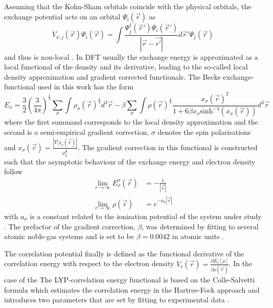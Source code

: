 Assuming that the Kohn-Sham orbitals coincide with the physical orbitals, the exchange potential acts on an orbital $\Psi_i(\vec{r})$ as
\begin{equation} \label{eq:HF_exch}
V_{x;j}(\vec{r})\Psi_i(\vec{r}) =\int \frac{\Psi_j^\dagger(\vec{r}') \Psi_i(\vec{r}')}{\left|\vec{r}-\vec{r'}\right|} d\vec{r}' \Psi_j(\vec{r})
\end{equation}
and thus is non-local \cite{Holthausen}. %
In DFT usually the exchange energy is approximated as a local functional of the density and its derivative, leading to the so-called local density approximation and gradient corrected functionals.
The Becke \cite{blyp} exchange-functional used in this work has the form
\begin{equation} \label{eq:blypXC}
E_x=\frac 32 \left(\frac{3}{4\pi}\right)^\frac 13 \sum_\sigma \int \rho_\sigma(\vec{r})^\frac 43 d^3\vec{r} 
-\beta \sum_\sigma \int \rho(\vec{r})^\frac 43 \frac{x_\sigma(\vec{r})^2}{1+6\beta x_\sigma \text{sinh}^{-1}( x_\sigma (\vec{r}))} d^3\vec{r}
\end{equation}
where the first summand corresponds to the local density approximation and the second is a semi-empirical gradient correction, $\sigma$ denotes the spin polarisations and $x_\sigma(\vec{r})=\frac{|\nabla \rho_\sigma(\vec{r})|}{\rho_\sigma^\frac 43}$. 
The gradient correction in this functional is constructed such that the asymptotic behaviour of the exchange energy and electron density follow
\begin{align}
  \lim_{r\rightarrow\infty} E_x^\sigma(\vec{r}) & =-\frac{1}{|\vec{r}|} \\
  \lim_{r\rightarrow\infty} \rho(\vec{r}) & =e^{-a_\sigma |\vec{r}|}
\end{align}
with $a_\sigma$ is a constant related to the ionisation potential of the system under study \cite{blyp}.
The prefactor of the gradient correction, $\beta$, was determined by fitting to several atomic noble-gas systems and is set to be $\beta=0.0042$ in atomic units \cite{blyp}.

The correlation potential finally is defined as the functional derivative of the correlation energy with respect to the electron density $V_c(\vec{r})=\frac{\partial E_c[\rho]}{\partial\rho(\vec{r})}$.
In the case of the
The LYP-correlation energy functional is based on the Colle-Salvetti formula which estimates the correlation energy in the Hartree-Fock approach and introduces two parameters that are set by fitting to experimental data \cite{lyp}.

